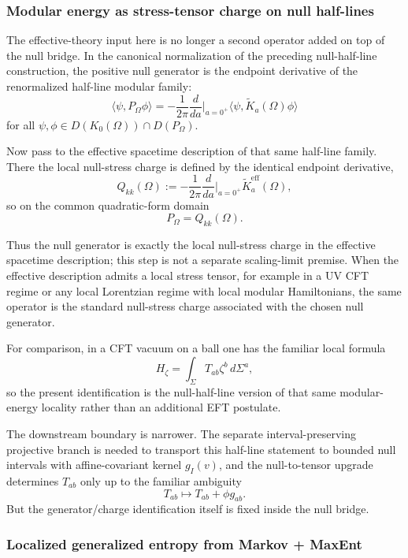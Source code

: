 \subsubsection{Modular energy as stress-tensor charge on null half-lines}\label{53-modular-energy-as-stress-tensor-charge-uv-cft}

The effective-theory input here is no longer a second operator added on top of the null bridge. In the canonical normalization of the preceding null-half-line construction, the positive null generator is the endpoint derivative of the renormalized half-line modular family:
\[
\langle\psi,P_\Omega\phi\rangle
=
-\frac{1}{2\pi}\frac{d}{da}\Big|_{a=0^+}
\langle\psi,\widetilde K_a(\Omega)\phi\rangle
\]
for all \(\psi,\phi\in D(K_0(\Omega))\cap D(P_\Omega)\).

Now pass to the effective spacetime description of that same half-line family. There the local null-stress charge is defined by the identical endpoint derivative,
\[
Q_{kk}(\Omega)
:=
-\frac{1}{2\pi}\frac{d}{da}\Big|_{a=0^+}\widetilde K^{\mathrm{eff}}_a(\Omega),
\]
so on the common quadratic-form domain
\[
P_\Omega = Q_{kk}(\Omega).
\]

Thus the null generator is exactly the local null-stress charge in the effective spacetime description; this step is not a separate scaling-limit premise. When the effective description admits a local stress tensor, for example in a UV CFT regime or any local Lorentzian regime with local modular Hamiltonians, the same operator is the standard null-stress charge associated with the chosen null generator.

For comparison, in a CFT vacuum on a ball one has the familiar local formula
\[
H_{\zeta}=\int_{\Sigma}T_{ab}\zeta^b\,d\Sigma^a,
\]
so the present identification is the null-half-line version of that same modular-energy locality rather than an additional EFT postulate.

The downstream boundary is narrower. The separate interval-preserving projective branch is needed to transport this half-line statement to bounded null intervals with affine-covariant kernel \(g_I(v)\), and the null-to-tensor upgrade determines \(T_{ab}\) only up to the familiar ambiguity
\[
T_{ab}\mapsto T_{ab}+\phi g_{ab}.
\]
But the generator/charge identification itself is fixed inside the null bridge.

\subsubsection{Localized generalized entropy from Markov + MaxEnt}\label{54-localized-generalized-entropy-from-markov--maxent}

